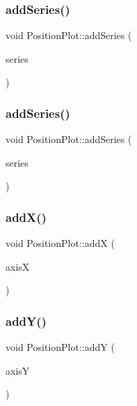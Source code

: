 \subsubsection{\texorpdfstring{add\+Series()}{addSeries()}\hspace{0.1cm}{\footnotesize\ttfamily [1/2]}}
{\footnotesize\ttfamily void Position\+Plot\+::add\+Series (\begin{DoxyParamCaption}\item[{Q\+Line\+Series $\ast$}]{series }\end{DoxyParamCaption})}

\mbox{\label{class_position_plot_aee942a64feec593434a27b55047cd349}} 
\subsubsection{\texorpdfstring{add\+Series()}{addSeries()}\hspace{0.1cm}{\footnotesize\ttfamily [2/2]}}
{\footnotesize\ttfamily void Position\+Plot\+::add\+Series (\begin{DoxyParamCaption}\item[{Q\+Scatter\+Series $\ast$}]{series }\end{DoxyParamCaption})}

\mbox{\label{class_position_plot_adf711353db86d512c0cab96e8014a96f}} 
\subsubsection{\texorpdfstring{add\+X()}{addX()}}
{\footnotesize\ttfamily void Position\+Plot\+::addX (\begin{DoxyParamCaption}\item[{Q\+Value\+Axis $\ast$}]{axisX }\end{DoxyParamCaption})}

\mbox{\label{class_position_plot_a3b97e6e75b34fafa1e2d1d1f2102cac3}} 
\subsubsection{\texorpdfstring{add\+Y()}{addY()}}
{\footnotesize\ttfamily void Position\+Plot\+::addY (\begin{DoxyParamCaption}\item[{Q\+Value\+Axis $\ast$}]{axisY }\end{DoxyParamCaption})}

